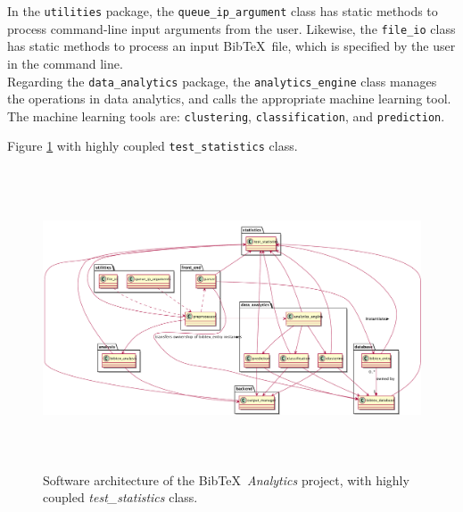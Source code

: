 In the {\tt utilities} package, the {\tt queue\_ip\_argument} class has static methods to process command-line input arguments from the user. Likewise, the {\tt file\_io} class has static methods to process an input {\sc Bib}\TeX\ file, which is specified by the user in the command line. \\

Regarding the {\tt data\_analytics} package, the {\tt analytics\_engine} class manages the operations in data analytics, and calls the appropriate machine learning tool. The machine learning tools are: {\tt clustering}, {\tt classification}, and {\tt prediction}.

Figure \ref{fig:SoftwareArchitectureWithHigherCoupling} with highly coupled {\tt test\_statistics} class.











\begin{figure}[h]
\centering 
\includegraphics[height=3.5in]{pics/sw-arch-higher-coupling/sw-arch}
\caption{Software architecture of the {\sc Bib}\TeX\ {\it Analytics} project, with highly coupled {\it test\_statistics} class.}
\label{fig:SoftwareArchitectureWithHigherCoupling}
\end{figure}










































